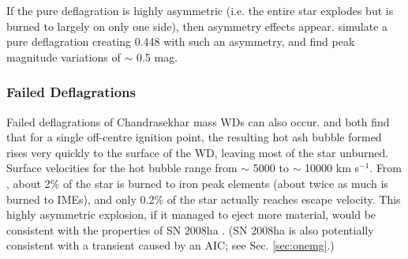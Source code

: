 If the pure deflagration is highly asymmetric (i.e. the entire star explodes but is burned to {\Ni} largely on only one side), then asymmetry effects appear.  \cite{sim+07} simulate a pure deflagration creating 0.448 {\Msun} {\Ni} with such an asymmetry, and find peak magnitude variations of $\sim$ 0.5 mag.

\subsubsection{Failed Deflagrations}

Failed deflagrations of Chandrasekhar mass WDs can also occur.  \cite{cald+04} and \cite{livnah05} both find that for a single off-centre ignition point, the resulting hot ash bubble formed rises very quickly to the surface of the WD, leaving most of the star unburned.  Surface velocities for the hot bubble range from $\sim$ 5000 to $\sim$ 10000 km s$^{-1}$.  From \cite{cald+04}, about 2\% of the star is burned to iron peak elements (about twice as much is burned to IMEs), and only 0.2\% of the star actually reaches escape velocity.  This highly asymmetric explosion, if it managed to eject more material, would be consistent with the properties of SN 2008ha \citep{fole+09}.  (SN 2008ha is also potentially consistent with a transient caused by an AIC; see Sec. \ref{sec:onemg}.)





